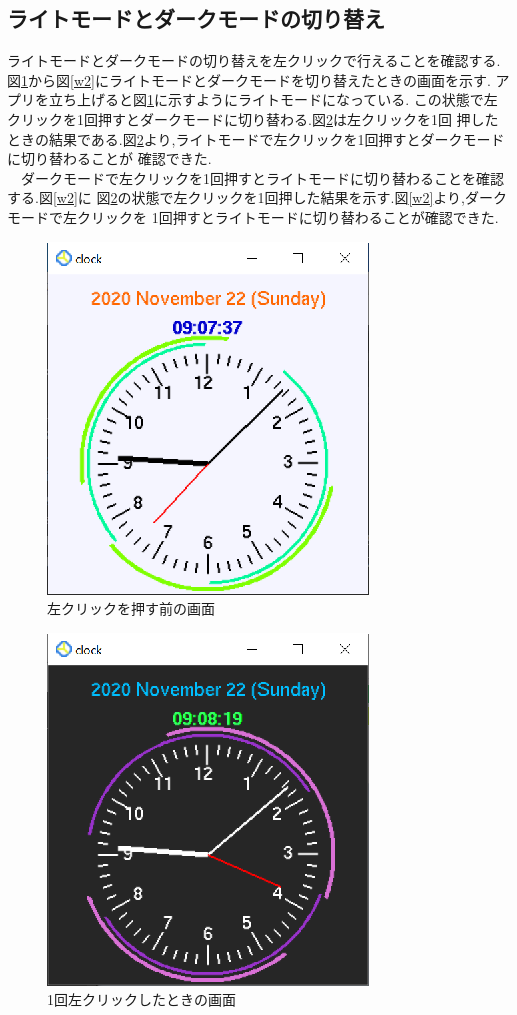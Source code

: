 \documentclass[a4j]{jarticle}
\begin{document}
        \subsection{ライトモードとダークモードの切り替え}
        ライトモードとダークモードの切り替えを左クリックで行えることを確認する.
        図\ref{w1}から図\ref{w2}にライトモードとダークモードを切り替えたときの画面を示す.
        アプリを立ち上げると図\ref{w1}に示すようにライトモードになっている.
        この状態で左クリックを1回押すとダークモードに切り替わる.図\ref{b}は左クリックを1回
        押したときの結果である.図\ref{b}より,ライトモードで左クリックを1回押すとダークモードに切り替わることが
        確認できた.\\
        　ダークモードで左クリックを1回押すとライトモードに切り替わることを確認する.図\ref{w2}に
        図\ref{b}の状態で左クリックを1回押した結果を示す.図\ref{w2}より,ダークモードで左クリックを
        1回押すとライトモードに切り替わることが確認できた.

        \begin{figure}[H]
          \centering
          \includegraphics[scale=1.1]{white1.eps}
          \caption{左クリックを押す前の画面}
           \label{w1}
          \end{figure}

          \begin{figure}[H]
          \centering
          \includegraphics[scale=1.1]{black.eps}
          \caption{1回左クリックしたときの画面}
           \label{b}
          \end{figure}
\end{document}
